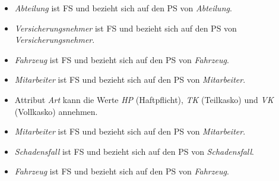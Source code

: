 \documentclass{bschlangaul-aufgabe}
\begin{document}
\begin{itemize}
\item \emph{Abteilung} ist FS und bezieht sich auf den PS von
\emph{Abteilung}.

\item \emph{Versicherungsnehmer} ist FS und bezieht sich auf den PS von
\emph{Versicherungsnehmer}.

\item \emph{Fahrzeug} ist FS und bezieht sich auf den PS von
\emph{Fahrzeug}.

\item \emph{Mitarbeiter} ist FS und bezieht sich auf den PS von
\emph{Mitarbeiter}.

\item Attribut \emph{Art} kann die Werte \emph{HP} (Haftpflicht),
\emph{TK} (Teilkasko) und \emph{VK} (Vollkasko) annehmen.

\item \emph{Mitarbeiter} ist FS und bezieht sich auf den PS von
\emph{Mitarbeiter}.

\item \emph{Schadensfall} ist FS und bezieht sich auf den PS von
\emph{Schadensfall}.

\item \emph{Fahrzeug} ist FS und bezieht sich auf den PS von
\emph{Fahrzeug}.
\end{itemize}
\end{document}
